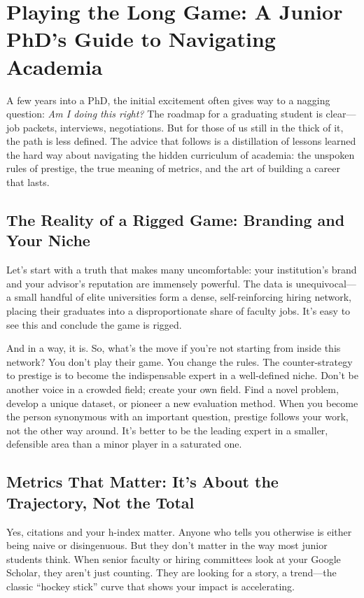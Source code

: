 
\section{Playing the Long Game: A Junior PhD's Guide to Navigating Academia}
\label{sec:junior_phd_guide}

A few years into a PhD, the initial excitement often gives way to a nagging question: \textit{Am I doing this right?}
The roadmap for a graduating student is clear---job packets, interviews, negotiations.
But for those of us still in the thick of it, the path is less defined.
The advice that follows is a distillation of lessons learned the hard way about navigating the hidden curriculum of academia: the unspoken rules of prestige, the true meaning of metrics, and the art of building a career that lasts.

\subsection{The Reality of a Rigged Game: Branding and Your Niche}

Let's start with a truth that makes many uncomfortable: your institution's brand and your advisor's reputation are immensely powerful.
The data is unequivocal---a small handful of elite universities form a dense, self-reinforcing hiring network, placing their graduates into a disproportionate share of faculty jobs.
It's easy to see this and conclude the game is rigged.

And in a way, it is.
So, what's the move if you're not starting from inside this network?
You don't play their game.
You change the rules.
The counter-strategy to prestige is to become the indispensable expert in a well-defined niche.
Don't be another voice in a crowded field; create your own field.
Find a novel problem, develop a unique dataset, or pioneer a new evaluation method.
When you become the person synonymous with an important question, prestige follows your work, not the other way around.
It's better to be the leading expert in a smaller, defensible area than a minor player in a saturated one.

\subsection{Metrics That Matter: It's About the Trajectory, Not the Total}

Yes, citations and your h-index matter.
Anyone who tells you otherwise is either being naive or disingenuous.
But they don't matter in the way most junior students think.
When senior faculty or hiring committees look at your Google Scholar, they aren't just counting.
They are looking for a story, a trend---the classic ``hockey stick'' curve that shows your impact is accelerating.

